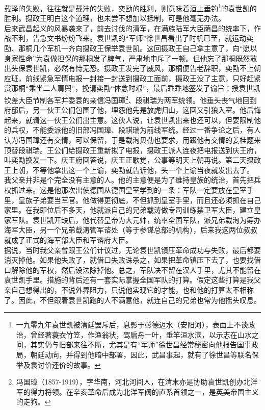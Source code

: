 载泽的失败，往往就是载沣的失败，奕劻的胜利，则意味着洹上垂钓\footnote{一九零九年袁世凯被清廷罢斥后，息影于彰德迈水（安阳河），表面上不谈政治，曾经著蓑衣竹笠，作渔翁状，驾扁舟一叶，垂竿洹水滨，以示志在山水之间，其实仍与旧部来往不断，尤其是有“军师”徐世昌经常秘密向他报告国事政局，朝廷动向，并得到他暗中部署，因此，武昌事起，就有了徐世昌等联名保举及袁讨价还价的故事。}的袁世凯的胜利。摄政王明白这个道理，也未尝不想加以抵制，可是他毫无办法。\\

后来武昌起义的风暴袭来了，前去讨伐的清军，在满族陆军大臣荫昌的统率下，作战不利，告急文书纷纷飞来。袁世凯的“军师”徐世昌看出了时机已至，就运动奕劻、那桐几个军机一齐向摄政王保举袁世凯。这回摄政王自己拿主意了，向“愿以身家性命”为袁做担保的那桐发了脾气，严肃地申斥了一顿。但他忘了那桐既然敢出头保袁世凯，必然有恃无恐。摄政王发完了威风，那桐便告老辞职，奕劻不上朝应班，前线紧急军情电报一封接一封送到摄政工面前，摄政王没了主意，只好赶紧赏那桐“乘坐二人肩舆”，挽请奕劻“体念时艰”，最后乖乖地签发了谕旨：授袁世凯钦差大臣节制各军并委袁的亲信冯国璋\footnote{冯国璋（1857-1919），字华南，河北河间人，在清末亦是协助袁世凯创办北洋军的得力将领。在辛亥革命后成为北洋军阀的直系首领之一，是英美帝国主义的走狗。}、段祺瑞为两军统领。他垂头丧气地回到府邸后，另一伙王公们包围了他，埋怨他先是放虎归山，这回又引狼入室。他后悔起来，就请这一伙王公们出主意。这伙人说，让袁世凯出来也还可以，但要限制他的兵权，不能委派他的旧部冯国璋、段祺瑞为前线军统。经过一番争论之后，有人认为冯国璋还有交情，可以保留，于是载洵贝勒也要求，用跟他有交情的姜桂题来顶替段祺瑞。王公们给摄政王重新拟了电报，摄政王派人连夜把电报送到庆王府，叫奕劻换发一下。庆王府回答说，庆王正歇觉，公事等明天上朝再说。第二天摄政王上朝，不等他拿出这一个上谕，奕劻就告诉他，头一个上谕当夜就发出去了。\\

我父亲并非是个完全没有主意的人。他的主意便是为了维持皇族的统治，首先把兵权抓过来。这是他那次出使德国从德国皇室学到的一条：军队一定要放在皇室手里，皇族子弟要当军官。他做得更彻底，不但抓到皇室手里，而且还必须抓在自己家里。在我即位后不多天，他就派自己的兄弟载涛做专司训练禁卫军大臣，建立皇家军队。袁世凯开缺后，他代替皇帝为大元帅，统率全国军队，派兄弟载洵为筹办海军大臣，另一个兄弟载涛管军谘处（等于参谋总部的机构），后来我这两位叔叔就成了正式的海军部大臣和军谘府大臣。\\

据说，当时我父亲曾跟王公们计议过，无论袁世凯镇压革命成功与失败，最后都要消灭掉他。如果他失败了，就借口失败诛杀之，如果把革命镇压下去了，也要找借口解除他的军权，然后设法除掉他。总之，军队决不留在汉人手里，尤其不能留在袁世凯手里。措施的背后还有一套实际掌握全国军队的打算。假定这些打算是我父亲自己想得出的，不说外界阻力，只说他实现它的才能，也和他的打算太不相称了。因此，不但跟着袁世凯跑的人不满意他，就连自己的兄弟也常为他摇头叹息。\\

